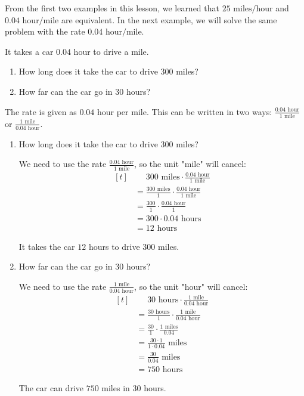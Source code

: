 From the first two examples in this lesson, we learned that $25 \text{ miles/hour}$ and $0.04 \text{ hour/mile}$ are equivalent. In the next example, we will solve the same problem with the rate $0.04 \text{ hour/mile}$.

\begin{myexample}
It takes a car $0.04$ hour to drive a mile.
\begin{enumerate}
\item How long does it take the car to drive $300$ miles?
\item How far can the car go in $30$ hours?
\end{enumerate}
\end{myexample}
\begin{solution}

The rate is given as $0.04$ hour per mile. This can be written in two ways: $\frac{0.04 \text{ hour}}{1 \text{ mile}}$ or $\frac{1 \text{ mile}}{0.04 \text{ hour}}$.

\begin{enumerate}
\item How long does it take the car to drive $300$ miles?

We need to use the rate $\frac{0.04 \text{ hour}}{1 \text{ mile}}$, so the unit "mile" will cancel:
\[
\begin{aligned}[t]
	&\phantom{{}=}300 \text{ miles} \cdot \frac{0.04 \text{ hour}}{1 \text{ mile}} \\
	&= \frac{300 \text{ miles}}{1} \cdot \frac{0.04 \text{ hour}}{1 \text{ mile}} \\
	&= \frac{300}{1} \cdot \frac{0.04 \text{ hour}}{1} \\
	&= 300 \cdot 0.04 \text{ hours} \\
	&= 12 \text{ hours}
\end{aligned}
\]

It takes the car $12$ hours to drive $300$ miles.
\item How far can the car go in $30$ hours?

We need to use the rate $\frac{1 \text{ mile}}{0.04 \text{ hour}}$, so the unit "hour" will cancel:
\[
\begin{aligned}[t]
	&\phantom{{}=}30 \text{ hours} \cdot \frac{1 \text{ mile}}{0.04 \text{ hour}} \\
	&= \frac{30 \text{ hours}}{1} \cdot \frac{1 \text{ mile}}{0.04 \text{ hour}} \\
	&= \frac{30}{1} \cdot \frac{1 \text{ miles}}{0.04} \\
	&= \frac{30 \cdot 1}{1 \cdot 0.04} \text{ miles} \\
	&= \frac{30}{0.04} \text{ miles} \\
	&= 750 \text{ hours}
\end{aligned}
\]

The car can drive $750$ miles in $30$ hours.
\end{enumerate}
\end{solution}

